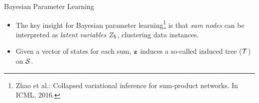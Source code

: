 \begin{frame}{Bayesian Parameter Learning}
  \begin{itemize}
    \item The key insight for Bayesian parameter learning\footnote{\scriptsize Zhao et al.: Collapsed variational inference for sum-product networks. In ICML, 2016.}
        is that \emph{sum nodes} can be interpreted as \emph{latent variables} $Z_{\mathsf{S}}$, clustering data instances.
    \item Given a vector of states for each sum, $\mathbf{z}$ induces a so-called induced tree ($\mathcal{T}$) on $\mathcal{S}$.
  \end{itemize}
  \begin{figure}
  \centering{
    
    }
\end{figure}
\end{frame}

